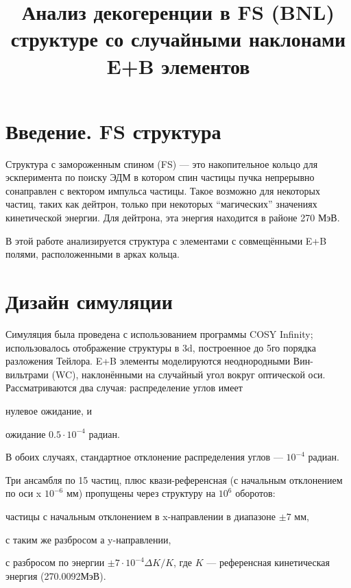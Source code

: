 \documentclass{article}
\newcommand{\Kmagic}{270.0092} %
\begin{document}
\title{Анализ декогеренции в FS (BNL) структуре со случайными наклонами E+B элементов}
\maketitle

\section{Введение. FS структура}

Структура с замороженным спином (FS) --- это накопительное кольцо для эскперимента по поиску ЭДМ в котором спин частицы пучка непрерывно сонаправлен с вектором импульса частицы. Такое возможно для некоторых частиц, таких как дейтрон, только при некоторых ``магических'' значениях кинетической энергии. Для дейтрона, эта энергия находится в районе 270 МэВ.

В этой работе анализируется структура с элементами с совмещёнными E+B полями, расположенными в арках кольца. 

\section{Дизайн симуляции}
Симуляция была проведена с использованием программы COSY Infinity; использовалось отображение структуры в 3d, построенное до 5го порядка разложения Тейлора. E+B элементы моделируются неоднородными Вин-вильтрами (WC), наклонёнными на случайный угол вокруг оптической оси. Рассматриваются два случая: распределение углов имеет
\begin{inparaenum}[1)]
\item нулевое ожидание, и
\item ожидание $0.5\cdot 10^{-4}$ радиан.
\end{inparaenum}
В обоих случаях, стандартное отклонение распределения углов --- $10^{-4}$ радиан.

Три ансамбля по 15 частиц, плюс квази-референсная (с начальным отклонением по оси x $10^{-6}$ мм) пропущены через структуру на $10^6$ оборотов:
\begin{inparaenum}[1)]
\item частицы с начальным отклонением в x-направлении в диапазоне $\pm 7$ мм,
\item с таким же разбросом а y-направлении,
\item с разбросом по энергии $\pm 7\cdot 10^{-4} \Delta K/K$, где $K$ --- референсная кинетическая энергия (\Kmagic МэВ).
\end{inparaenum}
\end{document}
